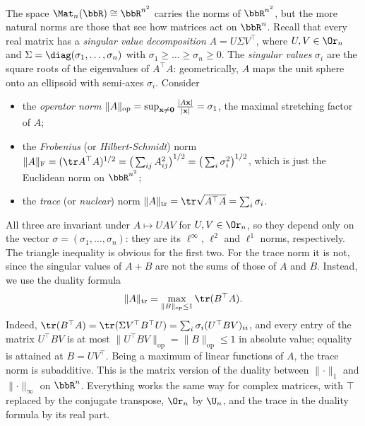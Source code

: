 \begin{example}\label{example matrix norms}
    The space $\Mat_n(\bbR)\cong\bbR^{n^2}$ carries the norms of $\bbR^{n^2}$, but the more natural norms are those that see how matrices act on $\bbR^n$. Recall that every real matrix has a \emph{singular value decomposition} $A=U\Sigma V^\top$, where $U,V\in\Or_n$ and $\Sigma=\diag(\sigma_1,\ldots,\sigma_n)$ with $\sigma_1\geq\ldots\geq\sigma_n\geq0$. The \emph{singular values} $\sigma_i$ are the square roots of the eigenvalues of $A^\top A$: geometrically, $A$ maps the unit sphere onto an ellipsoid with semi-axes $\sigma_i$. Consider
    \begin{itemize}
        \item the \emph{operator norm} $\lVert A\rVert_{\mathrm{op}}=\sup_{\bf{x}\neq 0}\frac{\lvert A\bf{x}\rvert}{\lvert \bf{x}\rvert}=\sigma_1$, the maximal stretching factor of $A$;
        \item the \emph{Frobenius} (or \emph{Hilbert-Schmidt}) norm $\lVert A\rVert_{\mathrm{F}}=(\tr A^\top A)^{1/2}=\big(\sum_{ij}A_{ij}^2\big)^{1/2}=\big(\sum_i\sigma_i^2\big)^{1/2}$, which is just the Euclidean norm on $\bbR^{n^2}$;
        \item the \emph{trace} (or \emph{nuclear}) norm $\lVert A\rVert_{\mathrm{tr}}=\tr\sqrt{A^\top A}=\sum_i\sigma_i$.
    \end{itemize}
    All three are invariant under $A\mapsto UAV$ for $U,V\in\Or_n$, so they depend only on the vector $\sigma=(\sigma_1,\ldots,\sigma_n)$: they are its $\ell^\infty$, $\ell^2$ and $\ell^1$ norms, respectively. The triangle inequality is obvious for the first two. For the trace norm it is not, since the singular values of $A+B$ are not the sums of those of $A$ and $B$. Instead, we use the duality formula
    \[\lVert A\rVert_{\mathrm{tr}}=\max_{\lVert B\rVert_{\mathrm{op}}\leq1}\tr(B^\top A).\]
    Indeed, $\tr(B^\top A)=\tr(\Sigma V^\top B^\top U)=\sum_i\sigma_i(U^\top BV)_{ii}$, and every entry of the matrix $U^\top BV$ is at most $\lVert U^\top BV\rVert_{\mathrm{op}}=\lVert B\rVert_{\mathrm{op}}\leq 1$ in absolute value; equality is attained at $B=UV^\top$. Being a maximum of linear functions of $A$, the trace norm is subadditive. This is the matrix version of the duality between $\lVert\cdot\rVert_1$ and $\lVert\cdot\rVert_\infty$ on $\bbR^n$. Everything works the same way for complex matrices, with $\top$ replaced by the conjugate transpose, $\Or_n$ by $\U_n$, and the trace in the duality formula by its real part.
\end{example}

